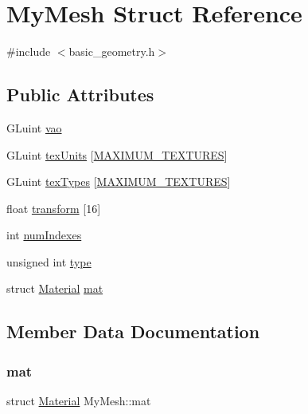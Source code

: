 \hypertarget{struct_my_mesh}{}\section{My\+Mesh Struct Reference}
\label{struct_my_mesh}


{\ttfamily \#include $<$basic\+\_\+geometry.\+h$>$}

\subsection*{Public Attributes}
\begin{DoxyCompactItemize}
\item 
G\+Luint \hyperlink{struct_my_mesh_a2e84e6ea2bf5ce3aa936e456577e7721}{vao}
\item 
G\+Luint \hyperlink{struct_my_mesh_a34f62cc69d253d529ede8a3c8f0c1530}{tex\+Units} \mbox{[}\hyperlink{basic__geometry_8h_ab5ca8e84cfd9b7c93955bc48faa7930c}{M\+A\+X\+I\+M\+U\+M\+\_\+\+T\+E\+X\+T\+U\+R\+ES}\mbox{]}
\item 
G\+Luint \hyperlink{struct_my_mesh_aabe1aa11c8b6419195d6f2ad1e0af294}{tex\+Types} \mbox{[}\hyperlink{basic__geometry_8h_ab5ca8e84cfd9b7c93955bc48faa7930c}{M\+A\+X\+I\+M\+U\+M\+\_\+\+T\+E\+X\+T\+U\+R\+ES}\mbox{]}
\item 
float \hyperlink{struct_my_mesh_aae0713b17789ccd6cbbf6b180186e3d9}{transform} \mbox{[}16\mbox{]}
\item 
int \hyperlink{struct_my_mesh_a55a2f11d01528d7e19af50a69754753b}{num\+Indexes}
\item 
unsigned int \hyperlink{struct_my_mesh_a2188266bb664818bc72d3f4430b05322}{type}
\item 
struct \hyperlink{struct_material}{Material} \hyperlink{struct_my_mesh_a0d2f28f872d29057b976a161dffdd4f9}{mat}
\end{DoxyCompactItemize}


\subsection{Member Data Documentation}
\mbox{\label{struct_my_mesh_a0d2f28f872d29057b976a161dffdd4f9}} 
\subsubsection{\texorpdfstring{mat}{mat}}
{\footnotesize\ttfamily struct \hyperlink{struct_material}{Material} My\+Mesh\+::mat}

